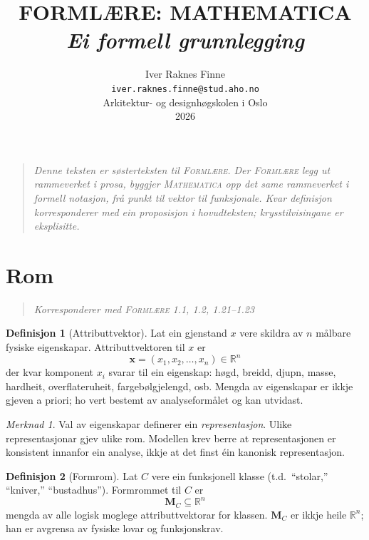 \documentclass[11pt, a4paper]{article}
\title{%
  \vspace{-1cm}
  {\huge\textbf{FORML\AE RE: MATHEMATICA}}\\[0.5em]
  {\large\textit{Ei formell grunnlegging}}
}
\author{
  Iver Raknes Finne\\
  \texttt{iver.raknes.finne@stud.aho.no}\\
  Arkitektur- og designh\o gskolen i Oslo\\
  2026
}
\date{}
\theoremstyle{definition}
\newtheorem{defn}{Definisjon}[section]
\theoremstyle{plain}
\theoremstyle{remark}
\newtheorem*{merknad}{Merknad}
\newcommand{\MC}{\mathbf{M}_C}
\newcommand{\x}{\mathbf{x}}
\newcommand{\Reals}{\mathbb{R}}
\newcommand{\formlaere}{\textsc{Forml\ae re}}
\begin{document}
\maketitle
\thispagestyle{empty}

\begin{quote}
\itshape
Denne teksten er s\o sterteksten til \formlaere. Der \formlaere{} legg ut rammeverket i prosa, byggjer \textsc{Mathematica} opp det same rammeverket i formell notasjon, fr\aa{} punkt til vektor til funksjonale. Kvar definisjon korresponderer med ein proposisjon i hovudteksten; krysstilvisingane er eksplisitte.
\end{quote}

\newpage
\tableofcontents
\newpage

\section{Rom}
\label{sec:rom}

\begin{quote}
\itshape Korresponderer med \formlaere{} 1.1, 1.2, 1.21--1.23
\end{quote}

\begin{defn}[Attributtvektor]
\label{def:attributtvektor}
Lat ein gjenstand $x$ vere skildra av $n$ m\aa lbare fysiske eigenskapar.
Attributtvektoren til $x$ er
\[
  \x = (x_1, x_2, \ldots, x_n) \in \Reals^n
\]
der kvar komponent $x_i$ svarar til ein eigenskap: h\o gd, breidd, djupn, masse, hardheit, overflateruheit, fargeb\o lgjelengd, osb. Mengda av eigenskapar er ikkje gjeven a priori; ho vert bestemt av analyseform\aa let og kan utvidast.
\end{defn}

\begin{merknad}
Val av eigenskapar definerer ein \emph{representasjon}. Ulike representasjonar gjev ulike rom. Modellen krev berre at representasjonen er konsistent innanfor ein analyse, ikkje at det finst \'ein kanonisk representasjon.
\end{merknad}

\begin{defn}[Formrom]
\label{def:formrom}
Lat $C$ vere ein funksjonell klasse (t.d.\ ``stolar,'' ``kniver,'' ``bustadhus'').
Formrommet til $C$ er
\[
  \MC \subseteq \Reals^n
\]
mengda av alle logisk moglege attributtvektorar for klassen. $\MC$ er ikkje heile $\Reals^n$; han er avgrensa av fysiske lovar og funksjonskrav.
\end{defn}
\end{document}
